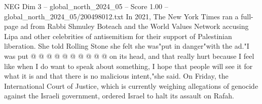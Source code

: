 \begin{textsample}{NEG Dim 3 – global\_north\_2024\_05 – Score 1.00 – global\_north\_2024\_05/200498012.txt}
In 2021, The New York Times ran a full-page ad from Rabbi Shmuley Boteach and the World Values Network accusing Lipa and other celebrities of antisemitism for their support of Palestinian liberation.
She told Rolling Stone she felt she was"put in danger"with the ad."I was put @ @ @ @ @ @ @ @ @ @ on its head, and that really hurt because I feel like when I do want to speak about something, I hope that people will see it for what it is and that there is no malicious intent,"she said.
On Friday, the International Court of Justice, which is currently weighing allegations of genocide against the Israeli government, ordered Israel to halt its assault on Rafah.

\end{textsample}

